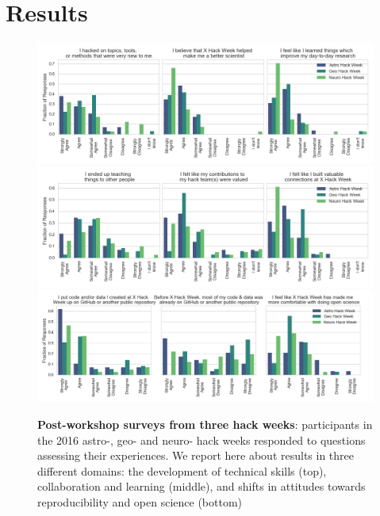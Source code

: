\section*{Results}

\begin{figure}[h!]
\begin{center}
\includegraphics[width=12cm]{fig/eval_techskills}
\includegraphics[width=12cm]{fig/eval_collab}
\includegraphics[width=12cm]{fig/eval_openscience}
\caption{{\bf Post-workshop surveys from three hack weeks}: participants in the 2016 astro-, geo- and neuro- hack weeks responded to questions assessing their experiences. We report here about results in three different domains: the development of technical skills (top), collaboration and learning (middle), and shifts in attitudes towards reproducibility and open science (bottom)}
\label{fig:survey}
\end{center}
\end{figure}

